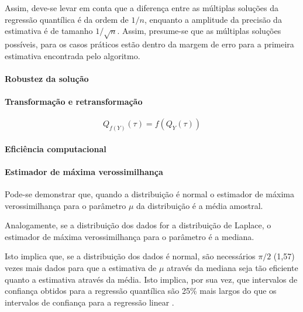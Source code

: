 \documentclass[a4paper, 12pt]{article}
\let\oldparagraph\paragraph
\renewcommand{\paragraph}[1]{\oldparagraph{#1}\mbox{}}
\begin{document}
Assim, deve-se levar em conta que a diferença entre as múltiplas
soluções da regressão quantílica é da ordem de \(1/n\), enquanto a
amplitude da precisão da estimativa é de tamanho \(1/\sqrt{n}\). Assim,
presume-se que as múltiplas soluções possíveis, para os casos práticos
estão dentro da margem de erro para a primeira estimativa encontrada
pelo algoritmo.

\hypertarget{robustez-da-solucao}{%
\paragraph{Robustez da solução}\label{robustez-da-solucao}}

\hypertarget{transformacao-e-retransformacao}{%
\paragraph{Transformação e
retransformação}\label{transformacao-e-retransformacao}}

\[Q_{f(Y)}(\tau) = f(Q_Y(\tau))\]

\hypertarget{eficiencia-computacional}{%
\paragraph{Eficiência computacional}\label{eficiencia-computacional}}

\hypertarget{estimador-de-maxima-verossimilhanca}{%
\paragraph{Estimador de máxima
verossimilhança}\label{estimador-de-maxima-verossimilhanca}}

Pode-se demonstrar que, quando a distribuição é normal o estimador de
máxima verossimilhança para o parâmetro \(\mu\) da distribuição é a
média amostral.

Analogamente, se a distribuição dos dados for a distribuição de Laplace,
o estimador de máxima verossimilhança para o parâmetro é a mediana.

Isto implica que, se a distribuição dos dados é normal, são necessários
\(\pi/2\) (1,57) vezes mais dados para que a estimativa de \(\mu\)
através da mediana seja tão eficiente quanto a estimativa através da
média. Isto implica, por sua vez, que intervalos de confiança obtidos
para a regressão quantílica são 25\% mais largos do que os intervalos de
confiança para a regressão linear
\autocites[354]{koenker2000}[92]{dasGupta}.
\end{document}
